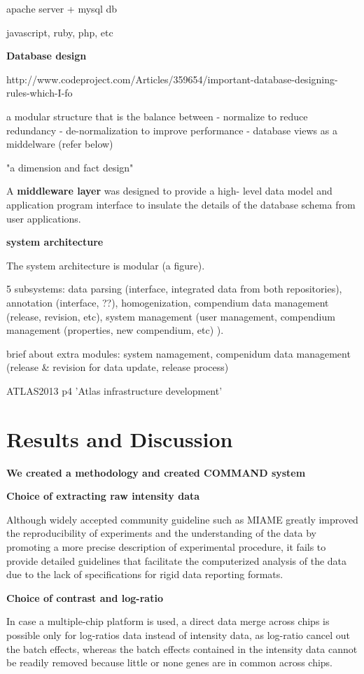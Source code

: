 apache server + mysql db

javascript, ruby, php, etc 


\textbf{Database design}

http://www.codeproject.com/Articles/359654/important-database-designing-rules-which-I-fo

a modular structure that is the balance between 
- normalize to reduce redundancy
- de-normalization to improve performance
- database views as a middelware (refer below)

"a dimension and fact design"

A \textbf{middleware layer} was designed to provide a high-
level data model and application program interface to
insulate the details of the database schema from user
applications. 


\textbf{system architecture}

The system architecture is modular (a figure). 

5 subsystems: data parsing (interface, integrated data from both
repositories), annotation (interface, ??), homogenization, compendium data management
(release, revision, etc), system management (user management,
compendium management (properties, new compendium, etc) ).

brief about extra modules: system namagement, compenidum data management 
(release \& revision for data update,  release process)


\cite{Petryszak2013} ATLAS2013 p4  'Atlas infrastructure development'




\section{Results and Discussion}

\textbf{We created a methodology and created COMMAND system}

\textbf{Choice of extracting raw intensity data}


Although widely accepted community guideline such as MIAME \cite{Brazma2001}
greatly improved the reproducibility of experiments and the understanding of
the data by promoting a more precise description of experimental procedure, it
fails to provide detailed guidelines that facilitate the computerized analysis
of the data due to the lack of specifications for rigid data reporting formats.


\textbf{Choice of contrast and log-ratio}

In case a multiple-chip platform is used, a direct data merge across
chips is possible only for log-ratios data instead of intensity data,
as log-ratio cancel out the batch effects, whereas the batch effects
contained in the intensity data cannot be readily removed because
little or none genes are in common across chips.


